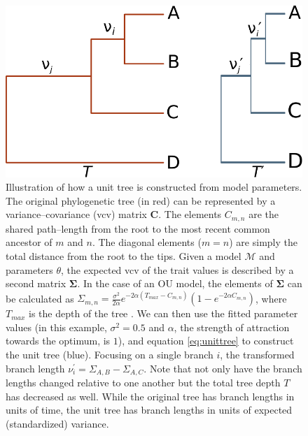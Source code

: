 \documentclass[a4paper,11pt]{article}
\begin{document}
\begin{figure}[p]
  \centering
  \includegraphics{figs/unit-tree}
  \caption{Illustration of how a unit tree is constructed from model parameters. The original phylogenetic tree (in red) can be represented by a variance--covariance (vcv) matrix $\mathbf{C}$. The elements $C_{m,n}$ are the shared path--length from the root to the most recent common ancestor of $m$ and $n$. The diagonal elements ($m = n$) are simply the total distance from the root to the tips. Given a model $\mathcal{M}$ and parameters $\theta$, the expected vcv of the trait values is described by a second matrix $\mathbf{\Sigma}$. In the case of an OU model, the elements of $\mathbf{\Sigma}$ can be calculated as $\Sigma_{m,n} = \frac{\sigma^2}{2\alpha} e^{-2\alpha (T_{max} - C_{m,n})} (1 - e^{-2\alpha C_{m,n}})$, where $T_{max}$ is the depth of the tree \citep{Hansen1997}. We can then use the fitted parameter values (in this example, $\sigma^2=0.5$ and $\alpha$, the strength of attraction towards the optimum, is $1$), and equation \ref{eq:unittree} to construct the unit tree (blue). Focusing on a single branch $i$, the transformed branch length $\nu_i^\prime = \Sigma_{A,B} - \Sigma_{A,C}$. Note that not only have the branch lengths changed relative to one another but the total tree depth $T$ has decreased as well. While the original tree has branch lengths in units of time, the unit tree has branch lengths in units of expected (standardized) variance.}
  \label{fig:box1}
\end{figure}
\end{document}

